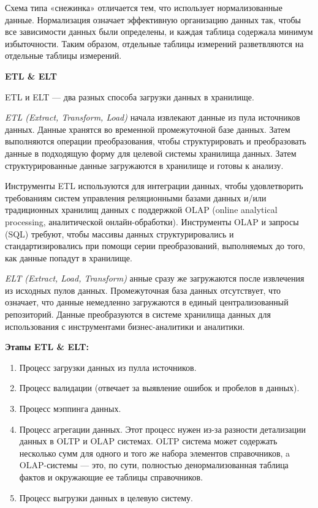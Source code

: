 Схема типа «снежинка» отличается тем, что использует нормализованные данные. Нормализация означает эффективную организацию данных так, чтобы все зависимости данных были определены, и каждая таблица содержала минимум избыточности. Таким образом, отдельные таблицы измерений разветвляются на отдельные таблицы измерений.

\textbf{ETL \&  ELT}

ETL и ELT — два разных способа загрузки данных в хранилище.

\textit{ETL (Extract, Transform, Load)} начала извлекают данные из пула источников данных. Данные хранятся во временной промежуточной базе данных. Затем выполняются операции преобразования, чтобы структурировать и преобразовать данные в подходящую форму для целевой системы хранилища данных. Затем структурированные данные загружаются в хранилище и готовы к анализу.

Инструменты ETL используются для интеграции данных, чтобы удовлетворить требованиям систем управления реляционными базами данных и/или традиционных хранилищ данных с поддержкой OLAP (online analytical processing, аналитической онлайн-обработки). Инструменты OLAP и запросы (SQL) требуют, чтобы массивы данных структурировались и стандартизировались при помощи серии преобразований, выполняемых до того, как данные попадут в хранилище.

\textit{ELT (Extract, Load, Transform)} анные сразу же загружаются после извлечения из исходных пулов данных. Промежуточная база данных отсутствует, что означает, что данные немедленно загружаются в единый централизованный репозиторий. Данные преобразуются в системе хранилища данных для использования с инструментами бизнес-аналитики и аналитики.

\textbf{Этапы ETL \&  ELT:}
\begin{enumerate}
	\item Процесс загрузки данных из пулла источников.
	\item Процесс валидации (отвечает за выявление ошибок и пробелов в данных).
	\item Процесс мэппинга данных.
	\item Процесс агрегации данных. Этот процесс нужен из-за разности детализации данных в OLTP и OLAP системах.
	OLTP система может содержать несколько сумм для одного и того же набора элементов справочников, a OLAP-системы — это, по сути, полностью денормализованная таблица фактов и окружающие ее таблицы справочников.
	\item Процесс выгрузки данных в целевую систему.
\end{enumerate}

